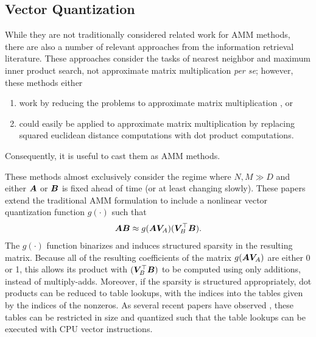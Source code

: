 
\subsection{Vector Quantization}

While they are not traditionally considered related work for AMM methods, there are also a number of relevant approaches from the information retrieval literature. These approaches consider the tasks of nearest neighbor and maximum inner product search, not approximate matrix multiplication \textit{per se}; however, these methods either
\begin{enumerate}
    \item work by reducing the problems to approximate matrix multiplication \cite{cq, aq, otq, sq, stackedQuantizers, bolt}, or
    \item could easily be applied to approximate matrix multiplication by replacing squared euclidean distance computations with dot product computations. \cite{pq, quckAdc, quickerAdc, pairq, grvq, opq, polysemous}
\end{enumerate}
Consequently, it is useful to cast them as AMM methods.

These methods almost exclusively consider the regime where $N, M \gg D$ and either $\bm{A}$ or $\bm{B}$ is fixed ahead of time (or at least changing slowly). These papers extend the traditional AMM formulation to include a nonlinear vector quantization function $g(\cdot)$ such that
\begin{align}
    \bm{A} \bm{B} \approx g(\bm{A} \bm{V}_A) (\bm{V}_B^\top \bm{B}).
\end{align}
The $g(\cdot)$ function binarizes and induces structured sparsity in the resulting matrix. Because all of the resulting coefficients of the matrix $g(\bm{A} \bm{V}_A)$ are either 0 or 1, this allows its product with $(\bm{V}_B^\top \bm{B})$ to be computed using only additions, instead of multiply-adds. Moreover, if the sparsity is structured appropriately, dot products can be reduced to table lookups, with the indices into the tables given by the indices of the nonzeros. As several recent papers have observed \cite{bolt, quickAdc, quickerAdc}, these tables can be restricted in size and quantized such that the table lookups can be executed with CPU vector instructions.

